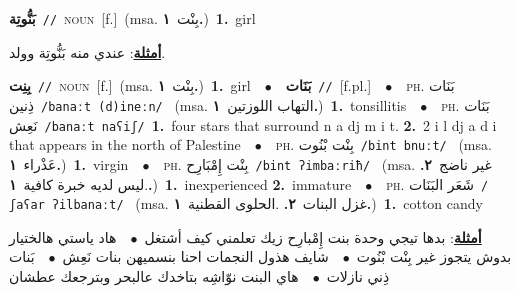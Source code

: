\documentclass[10pt,a4paper,twoside]{article} %
\begin{document}
\begin{multicols}{2}
{\setlength\topsep{0pt}\textbf{\foreignlanguage{arabic}{بَنُّوتِة}}\ {\color{gray}\texttt{//}\color{black}}\ \textsc{noun}\ [f.]\ \color{gray}(msa. \foreignlanguage{arabic}{بِنْت}~\foreignlanguage{arabic}{\textbf{١.}})\color{black}\ \textbf{1.}~girl\  \begin{flushright}\color{gray}\foreignlanguage{arabic}{\textbf{\underline{\foreignlanguage{arabic}{أمثلة}}}: عندي منه بَنُّوتِة وولد.}\end{flushright}\color{black}} \vspace{2mm}

{\setlength\topsep{0pt}\textbf{\foreignlanguage{arabic}{بِنِت}}\ {\color{gray}\texttt{//}\color{black}}\ \textsc{noun}\ [f.]\ \color{gray}(msa. \foreignlanguage{arabic}{بِنْت}~\foreignlanguage{arabic}{\textbf{١.}})\color{black}\ \textbf{1.}~girl\ \ $\bullet$\ \ \setlength\topsep{0pt}\textbf{\foreignlanguage{arabic}{بَنَات}}\ {\color{gray}\texttt{//}\color{black}}\ [f.pl.]\ \ $\bullet$\ \ \textsc{ph.} \color{gray} \foreignlanguage{arabic}{بَنَات ذِنين}\color{black}\ {\color{gray}\texttt{/{\sffamily banaːt (d)ineːn}/}\color{black}}\ \color{gray} (msa. \foreignlanguage{arabic}{التهاب اللوزتين}~\foreignlanguage{arabic}{\textbf{١.}})\color{black}\ \textbf{1.}~tonsillitis\ \ $\bullet$\ \ \textsc{ph.} \color{gray} \foreignlanguage{arabic}{بَنَات نَعِش}\color{black}\ {\color{gray}\texttt{/{\sffamily banaːt naʕiʃ}/}\color{black}}\ \textbf{1.}~four stars that surround n a dj m i t.  \textbf{2.}~2 i l dj a d i that appears in the north of Palestine\ \ $\bullet$\ \ \textsc{ph.} \color{gray} \foreignlanguage{arabic}{بِنْت بْنُوت}\color{black}\ {\color{gray}\texttt{/{\sffamily bint bnuːt}/}\color{black}}\ \color{gray} (msa. \foreignlanguage{arabic}{عَذْراء}~\foreignlanguage{arabic}{\textbf{١.}})\color{black}\ \textbf{1.}~virgin\ \ $\bullet$\ \ \textsc{ph.} \color{gray} \foreignlanguage{arabic}{بِنْت إِمْبَارِح}\color{black}\ {\color{gray}\texttt{/{\sffamily bint ʔimbaːriħ}/}\color{black}}\ \color{gray} (msa. \foreignlanguage{arabic}{غير ناضج}~\foreignlanguage{arabic}{\textbf{٢.}}  .\foreignlanguage{arabic}{ليس لديه خبرة كافية}~\foreignlanguage{arabic}{\textbf{١.}})\color{black}\ \textbf{1.}~inexperienced  \textbf{2.}~immature\ \ $\bullet$\ \ \textsc{ph.} \color{gray} \foreignlanguage{arabic}{شَعَر البَنَات}\color{black}\ {\color{gray}\texttt{/{\sffamily ʃaʕar ʔilbanaːt}/}\color{black}}\ \color{gray} (msa. \foreignlanguage{arabic}{غزل البنات}~\foreignlanguage{arabic}{\textbf{٢.}}  .\foreignlanguage{arabic}{الحلوى القطنية}~\foreignlanguage{arabic}{\textbf{١.}})\color{black}\ \textbf{1.}~cotton candy\  \begin{flushright}\color{gray}\foreignlanguage{arabic}{\textbf{\underline{\foreignlanguage{arabic}{أمثلة}}}: بدها تيجي وحدة بنت إِمْبارِح زيك تعلمني كيف أشتغل\ $\bullet$\ \  هاد ياستي هالختيار بدوش يتجوز غير بِنْت بْنُوت\ $\bullet$\ \  شايف هذول النجمات احنا بنسميهن بنات نَعِش\ $\bullet$\ \  بَنات ذِني نازلات\ $\bullet$\ \  هاي البنت نوّاشِه بتاخدك عالبحر وبترجعك عطشان}\end{flushright}\color{black}} \vspace{2mm}


\end{multicols}
\end{document}
